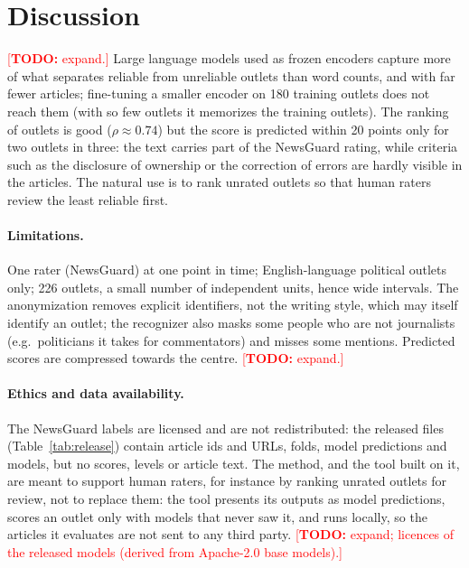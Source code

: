 \documentclass[11pt,a4paper]{article}
\newcommand{\todo}[1]{\textcolor{red}{[\textbf{TODO:} #1]}}
\begin{document}
\section{Discussion}\label{sec:discussion}
\todo{expand.} Large language models used as frozen encoders capture more of what separates reliable from unreliable
outlets than word counts, and with far fewer articles; fine-tuning a smaller encoder on 180 training outlets does not
reach them (with so few outlets it memorizes the training outlets). The ranking of outlets is good ($\rho \approx
0.74$) but the score is predicted within 20 points only for two outlets in three: the text carries part of the
NewsGuard rating, while criteria such as the disclosure of ownership or the correction of errors are hardly visible in
the articles. The natural use is to rank unrated outlets so that human raters review the least reliable first.

\paragraph{Limitations.}
One rater (NewsGuard) at one point in time; English-language political outlets only; 226 outlets, a small number
of independent units, hence wide intervals. The anonymization removes explicit identifiers, not the writing style,
which may itself identify an outlet; the recognizer also masks some people who are not journalists (e.g.\ politicians
it takes for commentators) and misses some mentions. Predicted scores are compressed towards the centre.
\todo{expand.}

\paragraph{Ethics and data availability.}
The NewsGuard labels are licensed and are not redistributed: the released files (Table~\ref{tab:release}) contain
article ids and URLs, folds, model predictions and models, but no scores, levels or article text. The method, and the
tool built on it, are meant to support human raters, for instance by ranking unrated outlets for review, not to
replace them: the tool presents its outputs as model predictions, scores an outlet only with models that never saw
it, and runs locally, so the articles it evaluates are not sent to any third party. \todo{expand; licences of the
released models (derived from Apache-2.0 base models).}
\end{document}
